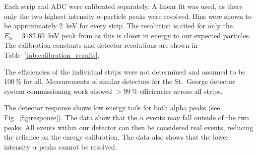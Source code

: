 Each strip and ADC were calibrated separately. A linear fit was used, as there
only the two highest intensity $\alpha$-particle peaks were resolved. Bins
were shown to be approximately 2~keV for every strip. The resolution is cited
for only the $E_{\alpha} = 3182.69$~keV peak from  as this is
closer in energy to our expected particles. The calibration constants and
detector resolutions are shown in Table~\ref{tab:calibration_results}.

The efficiencies of the individual strips were not determined and assumed to be
100\,\% for all. Measurements of similar detectors for the St.\ George detector
system commissioning work showed $>99$\,\% efficiencies across all strips.

The detector response shows low energy tails for both alpha peaks (see
Fig.~\ref{fig:response}). The data show that the $\alpha$ events may fall
outside of the two peaks. All events within our detector can then be considered
real events, reducing the reliance on the energy calibration. The data also
shows that the lower intensity  $\alpha$ peaks cannot be resolved.

